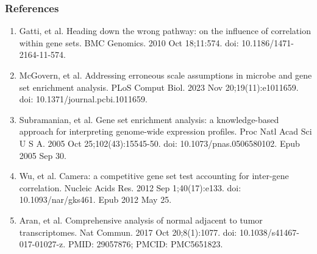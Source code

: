 \documentclass[11pt,t]{beamer}
\begin{document}
\begin{frame}
  \frametitle{References}

  \begin{enumerate}   
  \item \footnotesize{Gatti, et al. Heading down the wrong pathway: on the influence of correlation within gene sets. BMC Genomics. 2010 Oct 18;11:574. doi: 10.1186/1471-2164-11-574.}
  \item \footnotesize{McGovern, et al. Addressing erroneous scale assumptions in microbe and gene set enrichment analysis. PLoS Comput Biol. 2023 Nov 20;19(11):e1011659. doi: 10.1371/journal.pcbi.1011659.}
   \item \footnotesize{Subramanian, et al. Gene set enrichment analysis: a knowledge-based approach for interpreting genome-wide expression profiles. Proc Natl Acad Sci U S A. 2005 Oct 25;102(43):15545-50. doi: 10.1073/pnas.0506580102. Epub 2005 Sep 30.}
   \item \footnotesize{Wu, et al. Camera: a competitive gene set test accounting for inter-gene correlation. Nucleic Acids Res. 2012 Sep 1;40(17):e133. doi: 10.1093/nar/gks461. Epub 2012 May 25.}
     \item \footnotesize{Aran, et al. Comprehensive analysis of normal adjacent to tumor transcriptomes. Nat Commun. 2017 Oct 20;8(1):1077. doi: 10.1038/s41467-017-01027-z. PMID: 29057876; PMCID: PMC5651823.}
  \end{enumerate}
  
\end{frame}
\end{document}
